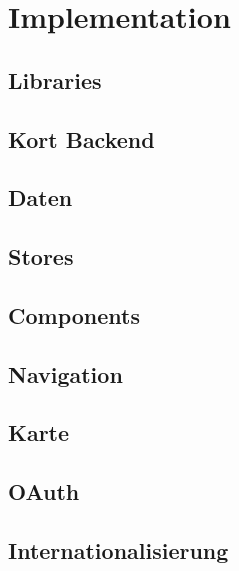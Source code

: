 \chapter{Implementation}
\label{pd-implementation}

\section{Libraries}


\section{Kort Backend}


\section{Daten}


\section{Stores}


\section{Components}


\section{Navigation}


\section{Karte}


\section{OAuth}


\section{Internationalisierung}


